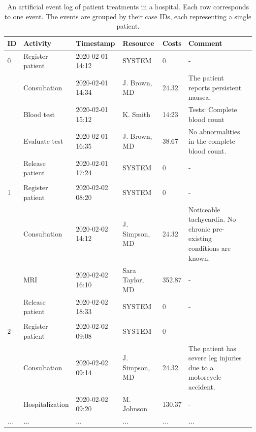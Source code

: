 \begin{table}[htbp!]
	\small
	\setlength\tabcolsep{3pt}
	\begin{tabularx}{\textwidth}{lllllp{4.7cm}l}
		\toprule
		\textbf{ID} & \textbf{Activity}          & \textbf{Timestamp} & \textbf{Resource} & \textbf{Costs} & \textbf{Comment}  \\
		\midrule
		0                & Register patient           & 2020-02-01 14:12   & SYSTEM            & 0             & -     \\
		& Consultation               & 2020-02-01 14:34   & J. Brown, MD    & 24.32         & The patient reports persistent nausea.   \\
		& Blood test                 & 2020-02-01 15:12   & K. Smith         & 14:23         & Tests: Complete blood count    \\
		& Evaluate test  & 2020-02-01 16:35   & J. Brown, MD    & 38.67         &No abnormalities in the complete blood count.   \\
		& Release patient            & 2020-02-01 17:24   & SYSTEM            & 0             & -  \\
		&                            &                    &                   &               &     \\
		\midrule
		1                & Register patient           & 2020-02-02 08:20   & SYSTEM            & 0             & -  \\
		& Consultation               & 2020-02-02 14:12   & J. Simpson, MD  & 24.32         & Noticeable tachycardia. No chronic pre-existing conditions are known.    \\
		& MRI & 2020-02-02 16:10   & Sara Taylor, MD   & 352.87        & -    \\
		& Release patient            & 2020-02-02 18:33   & SYSTEM            & 0             & -   \\
		&                            &                    &                   &               &     \\
		\midrule
		2                & Register patient           & 2020-02-02 09:08   & SYSTEM            & 0             & -    \\
		& Consultation               & 2020-02-02 09:14   & J. Simpson, MD  & 24.32         & The patient has severe leg injuries due to a motorcycle accident.  \\
		& Hospitalization       & 2020-02-02 09:20   & M. Johnson      & 130.37        & -     \\
		...              & ...                        & ...                & ...               & ...           & ...     \\ \bottomrule
	\end{tabularx}
	\caption[Artificial event log of patient treatments in a hospital]{An artificial event log of patient treatments in a hospital. Each row corresponds to one event. The events are grouped by their case IDs, each representing a single patient.}
	\label{tab:event-log}
\end{table}

